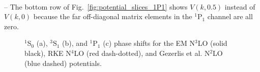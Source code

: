 \documentclass[preprintnumbers,floatfix,aps,prc,preprint,nofootinbib]{revtex4-1}
\begin{document}
\\
-- The bottom row of Fig.~\ref{fig:potential_slices_1P1} shows $V(k,0.5)$ instead of $V(k,0)$ because the far off-diagonal matrix elements in the $^1$P$_1$ channel are all zero.
\begin{figure}[H]
	\centering
	\quad
	\quad
	\caption{$^1$S$_0$ (a), $^3$S$_1$ (b), and $^1$P$_1$ (c) phase shifts for the EM N$^3$LO (solid black), RKE N$^4$LO (red dash-dotted), and Gezerlis et al. N$^2$LO (blue dashed) potentials.}
	\label{fig:phase_shifts}
\end{figure}
%
\end{document}

